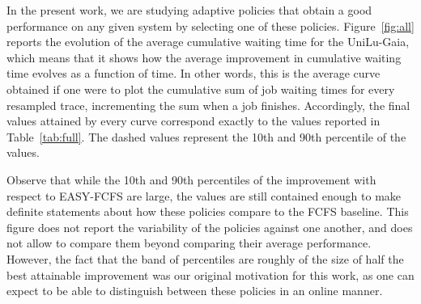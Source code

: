\documentclass[sigconf,anonymous]{acmart}
\begin{document}
In the present work, we are studying adaptive policies that obtain a good
performance on any given system by selecting one of these policies.
Figure~\ref{fig:all} reports the evolution of the average cumulative waiting
time for the UniLu-Gaia, which means that it shows how the average improvement
in cumulative waiting time evolves as a function of time.  In other words, this
is the average curve obtained if one were to plot the cumulative sum of job
waiting times for every resampled trace, incrementing the sum when a job
finishes. Accordingly, the final values attained by every curve correspond
exactly to the values reported in Table~\ref{tab:full}. The dashed values
represent the 10th and 90th percentile of the values.

Observe that while the 10th and 90th percentiles of the improvement with
respect to EASY-FCFS are large, the values are still contained enough to make
definite statements about how these policies compare to the FCFS baseline.
This figure does not report the variability of the policies against one another,
and does not allow to compare them beyond comparing their average performance.
However, the fact that the band of percentiles are roughly of the size of half
the best attainable improvement was our original motivation for this work, as
one can expect to be able to distinguish between these policies in an
online manner.
\end{document}
